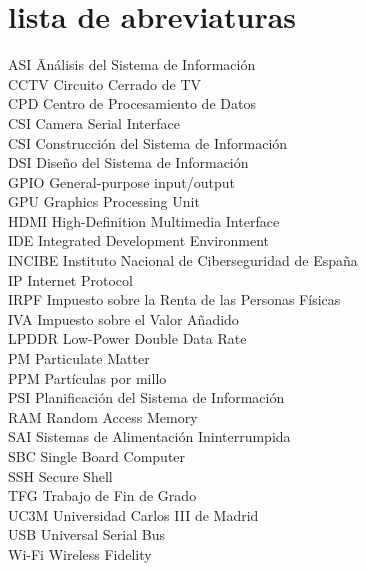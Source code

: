 \newpage %
\thispagestyle{empty}
\mbox{}

\chapter*{lista de abreviaturas}
\begin{tabbing}  %
	ASI \quad\quad\quad\= Análisis del Sistema de Información \\
	CCTV \> Circuito Cerrado de TV \\
	CPD \>  Centro de Procesamiento de Datos \\
	CSI \> Camera Serial Interface \\
	CSI \> Construcción del Sistema de Información \\
	DSI \> Diseño del Sistema de Información \\
	GPIO \> General-purpose input/output \\
	GPU \> Graphics Processing Unit \\
	HDMI \> High-Definition Multimedia Interface \\
	IDE \> Integrated Development Environment \\
	INCIBE \> Instituto Nacional de Ciberseguridad de España \\
	IP \> Internet Protocol \\
	IRPF \> Impuesto sobre la Renta de las Personas Físicas \\
	IVA \>  Impuesto sobre el Valor Añadido \\
	LPDDR \> Low-Power Double Data Rate \\
	PM \> Particulate Matter \\
	PPM \> Partículas por millo \\
	PSI \> Planificación del Sistema de Información \\
	RAM \> Random Access Memory \\
	SAI \> Sistemas de Alimentación Ininterrumpida \\
	SBC \> Single Board Computer \\
	SSH \> Secure Shell \\
	TFG \>  Trabajo de Fin de Grado \\
	UC3M  \>  Universidad Carlos III de Madrid \\
	USB \> Universal Serial Bus \\
	Wi-Fi \> Wireless Fidelity
\end{tabbing}